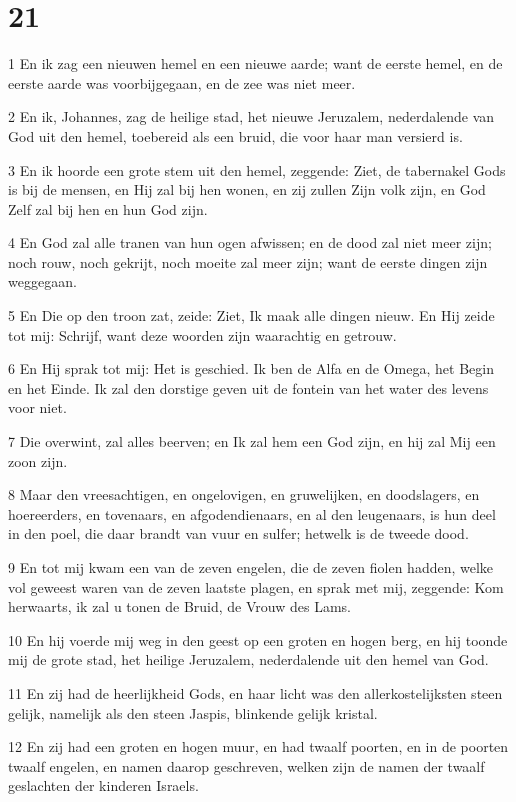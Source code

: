 \chapter{21}

\par 1 En ik zag een nieuwen hemel en een nieuwe aarde; want de eerste hemel, en de eerste aarde was voorbijgegaan, en de zee was niet meer.
\par 2 En ik, Johannes, zag de heilige stad, het nieuwe Jeruzalem, nederdalende van God uit den hemel, toebereid als een bruid, die voor haar man versierd is.
\par 3 En ik hoorde een grote stem uit den hemel, zeggende: Ziet, de tabernakel Gods is bij de mensen, en Hij zal bij hen wonen, en zij zullen Zijn volk zijn, en God Zelf zal bij hen en hun God zijn.
\par 4 En God zal alle tranen van hun ogen afwissen; en de dood zal niet meer zijn; noch rouw, noch gekrijt, noch moeite zal meer zijn; want de eerste dingen zijn weggegaan.
\par 5 En Die op den troon zat, zeide: Ziet, Ik maak alle dingen nieuw. En Hij zeide tot mij: Schrijf, want deze woorden zijn waarachtig en getrouw.
\par 6 En Hij sprak tot mij: Het is geschied. Ik ben de Alfa en de Omega, het Begin en het Einde. Ik zal den dorstige geven uit de fontein van het water des levens voor niet.
\par 7 Die overwint, zal alles beerven; en Ik zal hem een God zijn, en hij zal Mij een zoon zijn.
\par 8 Maar den vreesachtigen, en ongelovigen, en gruwelijken, en doodslagers, en hoereerders, en tovenaars, en afgodendienaars, en al den leugenaars, is hun deel in den poel, die daar brandt van vuur en sulfer; hetwelk is de tweede dood.
\par 9 En tot mij kwam een van de zeven engelen, die de zeven fiolen hadden, welke vol geweest waren van de zeven laatste plagen, en sprak met mij, zeggende: Kom herwaarts, ik zal u tonen de Bruid, de Vrouw des Lams.
\par 10 En hij voerde mij weg in den geest op een groten en hogen berg, en hij toonde mij de grote stad, het heilige Jeruzalem, nederdalende uit den hemel van God.
\par 11 En zij had de heerlijkheid Gods, en haar licht was den allerkostelijksten steen gelijk, namelijk als den steen Jaspis, blinkende gelijk kristal.
\par 12 En zij had een groten en hogen muur, en had twaalf poorten, en in de poorten twaalf engelen, en namen daarop geschreven, welken zijn de namen der twaalf geslachten der kinderen Israels.
